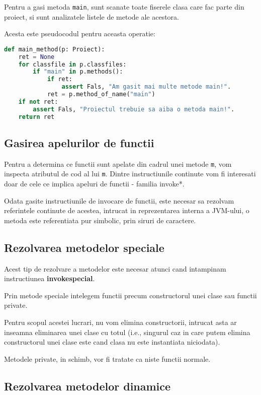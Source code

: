 Pentru a gasi metoda \texttt{main}, sunt scanate toate fiserele
clasa care fac parte din proiect, si sunt analizatele listele de
metode ale acestora.

Acesta este pseudocodul pentru aceasta operatie:
\begin{lstlisting}[language=Python]
def main_method(p: Proiect):
    ret = None
    for classfile in p.classfiles:
        if "main" in p.methods():
            if ret:
                assert Fals, "Am gasit mai multe metode main!".
            ret = p.method_of_name("main")
    if not ret:
        assert Fals, "Proiectul trebuie sa aiba o metoda main!".
    return ret
\end{lstlisting}

\subsection{Gasirea apelurilor de functii}

Pentru a determina ce functii sunt apelate din cadrul unei metode \texttt{m},
vom inspecta atributul de cod al lui \texttt{m}.
Dintre instructiunile continute vom fi interesati doar de cele ce implica
apeluri de functii - familia invoke*.

Odata gasite instructiunile de invocare de functii, este necesar sa rezolvam
referintele continute de acestea, intrucat in reprezentarea interna a JVM-ului,
o metoda este referentiata pur simbolic, prin siruri de caractere.

\subsection{Rezolvarea metodelor speciale}

Acest tip de rezolvare a metodelor este necesar atunci cand intampinam
instructiunea \textbf{invokespecial}.

Prin metode speciale intelegem functii precum constructorul unei clase sau
functii private.

Pentru scopul acestei lucrari, nu vom elimina constructorii, intrucat asta ar
inseamna eliminarea unei clase cu totul (i.e., singurul caz in care putem
elimina constructorul unei clase este cand clasa nu este instantiata niciodata).

Metodele private, in schimb, vor fi tratate ca niste functii normale.

\subsection{Rezolvarea metodelor dinamice}


